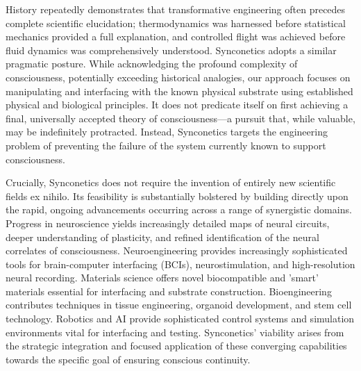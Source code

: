 \documentclass[10pt]{article}
\begin{document}
\begin{sloppypar}
  History repeatedly demonstrates that transformative engineering often precedes complete scientific elucidation; thermodynamics was harnessed before statistical mechanics provided a full explanation, and controlled flight was achieved before fluid dynamics was comprehensively understood. Synconetics adopts a similar pragmatic posture. While acknowledging the profound complexity of consciousness, potentially exceeding historical analogies, our approach focuses on manipulating and interfacing with the known physical substrate using established physical and biological principles. It does not predicate itself on first achieving a final, universally accepted theory of consciousness—a pursuit that, while valuable, may be indefinitely protracted. Instead, Synconetics targets the engineering problem of preventing the failure of the system currently known to support consciousness.

  Crucially, Synconetics does not require the invention of entirely new scientific fields ex nihilo. Its feasibility is substantially bolstered by building directly upon the rapid, ongoing advancements occurring across a range of synergistic domains. Progress in neuroscience yields increasingly detailed maps of neural circuits, deeper understanding of plasticity, and refined identification of the neural correlates of consciousness. Neuroengineering provides increasingly sophisticated tools for brain-computer interfacing (BCIs), neurostimulation, and high-resolution neural recording. Materials science offers novel biocompatible and 'smart' materials essential for interfacing and substrate construction. Bioengineering contributes techniques in tissue engineering, organoid development, and stem cell technology. Robotics and AI provide sophisticated control systems and simulation environments vital for interfacing and testing. Synconetics' viability arises from the strategic integration and focused application of these converging capabilities towards the specific goal of ensuring conscious continuity.


\end{sloppypar}
\end{document}
